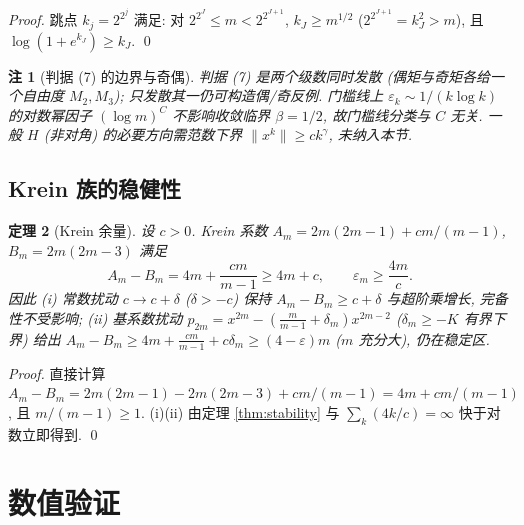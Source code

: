 \documentclass[UTF8]{ctexart}
\newtheorem{theorem}{定理}[section]
\newtheorem{remark}[theorem]{注}
\begin{document}
\begin{proof}
	跳点 $k_j = 2^{2^j}$ 满足: 对 $2^{2^J} \leq m < 2^{2^{J+1}}$,
	$k_J \geq m^{1/2}$ ($2^{2^{J+1}} = k_J^2 > m$), 且
	$\log(1+e^{k_J}) \geq k_J$. \qed
\end{proof}

\begin{remark}[判据 (7) 的边界与奇偶]
	判据 (7) 是两个级数同时发散 (偶矩与奇矩各给一个自由度
	$M_2, M_3$); 只发散其一仍可构造偶/奇反例. 门槛线上
	$\varepsilon_k \sim 1/(k\log k)$ 的对数幂因子 $(\log m)^C$
	不影响收敛临界 $\beta = 1/2$, 故门槛线分类与 $C$ 无关.
	一般 $H$ (非对角) 的必要方向需范数\emph{下界}
	$\|x^k\| \geq c k^\gamma$, 未纳入本节.
\end{remark}

\subsection{Krein 族的稳健性}

\begin{theorem}[Krein 余量]\label{thm:margin}
	设 $c > 0$. Krein 系数 $A_m = 2m(2m-1) + cm/(m-1)$, $B_m = 2m(2m-3)$
	满足
	\begin{equation}
		A_m - B_m = 4m + \frac{cm}{m-1} \geq 4m + c,
		\qquad \varepsilon_m \geq \frac{4m}{c}.
	\end{equation}
	因此 (i) 常数扰动 $c \to c + \delta$ ($\delta > -c$) 保持
	$A_m - B_m \geq c + \delta$ 与超阶乘增长, 完备性不受影响;
	(ii) 基系数扰动 $p_{2m} = x^{2m} - (\frac{m}{m-1} + \delta_m)x^{2m-2}$
	($\delta_m \geq -K$ 有界下界) 给出
	$A_m - B_m \geq 4m + \frac{cm}{m-1} + c\delta_m \geq (4-\varepsilon)m$
	($m$ 充分大), 仍在稳定区.
\end{theorem}

\begin{proof}
	直接计算 $A_m - B_m = 2m(2m-1) - 2m(2m-3) + cm/(m-1) = 4m + cm/(m-1)$,
	且 $m/(m-1) \geq 1$. (i)(ii) 由定理 \ref{thm:stability} 与
	$\sum_k (4k/c) = \infty$ 快于对数立即得到. \qed
\end{proof}

\section{数值验证}
\end{document}
